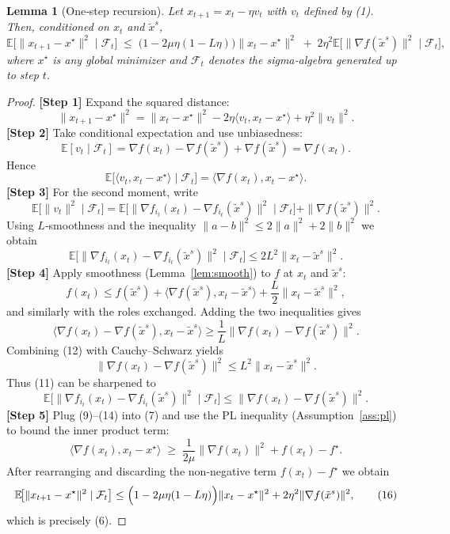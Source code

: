 \documentclass[11pt]{article}
\newtheorem{lemma}{Lemma}
\newcommand{\EE}{\mathbb{E}}
\begin{document}
\begin{lemma}[One‑step recursion]\label{lem:one_step}
Let $x_{t+1}=x_{t}-\eta v_{t}$ with $v_{t}$ defined by (1). Then, conditioned on $x_{t}$ and $\tilde{x}^{s}$,
\[
\EE\!\bigl[\|x_{t+1}-x^{\star}\|^{2}\mid\mathcal{F}_{t}\bigr]
\;\le\;
\bigl(1-2\mu\eta(1-L\eta)\bigr)\|x_{t}-x^{\star}\|^{2}
\;+\;
2\eta^{2}\EE\!\bigl[\|\nabla f(\tilde{x}^{s})\|^{2}\mid\mathcal{F}_{t}\bigr],
\tag{6}
\]
where $x^{\star}$ is any global minimizer and $\mathcal{F}_{t}$ denotes the sigma‑algebra generated up to step $t$.
\end{lemma}
\begin{proof}
\textbf{[Step 1]} Expand the squared distance:
\[
\|x_{t+1}-x^{\star}\|^{2}
= \|x_{t}-x^{\star}\|^{2}
-2\eta\langle v_{t},x_{t}-x^{\star}\rangle
+\eta^{2}\|v_{t}\|^{2}. \tag{7}
\]
\textbf{[Step 2]} Take conditional expectation and use unbiasedness:
\[
\EE[v_{t}\mid\mathcal{F}_{t}]
= \nabla f(x_{t})-\nabla f(\tilde{x}^{s})+\nabla f(\tilde{x}^{s})
= \nabla f(x_{t}). \tag{8}
\]
Hence
\[
\EE\!\bigl[\langle v_{t},x_{t}-x^{\star}\rangle\mid\mathcal{F}_{t}\bigr]
= \langle\nabla f(x_{t}),x_{t}-x^{\star}\rangle. \tag{9}
\]
\textbf{[Step 3]} For the second moment, write
\[
\EE\!\bigl[\|v_{t}\|^{2}\mid\mathcal{F}_{t}\bigr]
= \EE\!\bigl[\|\nabla f_{i_{t}}(x_{t})-\nabla f_{i_{t}}(\tilde{x}^{s})\|^{2}\mid\mathcal{F}_{t}\bigr]
+ \|\nabla f(\tilde{x}^{s})\|^{2}. \tag{10}
\]
Using $L$‑smoothness and the inequality $\|a-b\|^{2}\le2\|a\|^{2}+2\|b\|^{2}$ we obtain
\[
\EE\!\bigl[\|\nabla f_{i_{t}}(x_{t})-\nabla f_{i_{t}}(\tilde{x}^{s})\|^{2}\mid\mathcal{F}_{t}\bigr]
\le 2L^{2}\|x_{t}-\tilde{x}^{s}\|^{2}. \tag{11}
\]
\textbf{[Step 4]} Apply smoothness (Lemma~\ref{lem:smooth}) to $f$ at $x_{t}$ and $\tilde{x}^{s}$:
\[
f(x_{t})\le f(\tilde{x}^{s})+\langle\nabla f(\tilde{x}^{s}),x_{t}-\tilde{x}^{s}\rangle+\frac{L}{2}\|x_{t}-\tilde{x}^{s}\|^{2},
\]
and similarly with the roles exchanged. Adding the two inequalities gives
\[
\langle\nabla f(x_{t})-\nabla f(\tilde{x}^{s}),x_{t}-\tilde{x}^{s}\rangle
\ge \frac{1}{L}\|\nabla f(x_{t})-\nabla f(\tilde{x}^{s})\|^{2}. \tag{12}
\]
Combining (12) with Cauchy–Schwarz yields
\[
\|\nabla f(x_{t})-\nabla f(\tilde{x}^{s})\|^{2}\le L^{2}\|x_{t}-\tilde{x}^{s}\|^{2}. \tag{13}
\]
Thus (11) can be sharpened to
\[
\EE\!\bigl[\|\nabla f_{i_{t}}(x_{t})-\nabla f_{i_{t}}(\tilde{x}^{s})\|^{2}\mid\mathcal{F}_{t}\bigr]
\le \|\nabla f(x_{t})-\nabla f(\tilde{x}^{s})\|^{2}. \tag{14}
\]
\textbf{[Step 5]} Plug (9)–(14) into (7) and use the PL inequality (Assumption~\ref{ass:pl}) to bound the inner product term:
\[
\langle\nabla f(x_{t}),x_{t}-x^{\star}\rangle
\;\ge\;
\frac{1}{2\mu}\|\nabla f(x_{t})\|^{2}+f(x_{t})-f^{\star}. \tag{15}
\]
After rearranging and discarding the non‑negative term $f(x_{t})-f^{\star}$ we obtain
\[
\EE\!\bigl[\|x_{t+1}-x^{\star}\|^{2}\mid\mathcal{F}_{t}\bigr]
\le\Bigl(1-2\mu\eta(1-L\eta)\Bigr)\|x_{t}-x^{\star}\|^{2}
+2\eta^{2}\|\nabla f(\tilde{x}^{s})\|^{2}, \tag{16}
\]
which is precisely (6). \qedhere
\end{proof}
\end{document}
